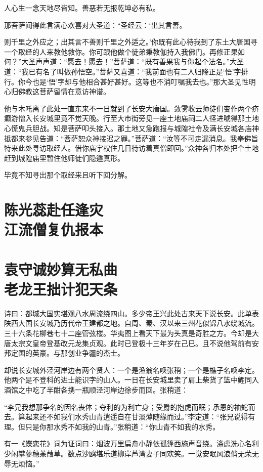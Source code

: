 \documentclass[12pt,UTF8]{ctexbook}
\begin{document}
{人心生一念天地尽皆知。善恶若无报乾坤必有私。

那菩萨闻得此言满心欢喜对大圣道：“圣经云：‘出其言善。

则千里之外应之；出其言不善则千里之外适之。’你既有此心待我到了东土大唐国寻一个取经的人来教他救你。你可跟他做个徒弟秉教伽持入我佛门。再修正果如何？”大圣声声道：“愿去！愿去！”菩萨道：“既有善果我与你起个法名。”大圣道：“我已有名了叫做孙悟空。”菩萨又喜道：“我前面也有二人归降正是‘悟’字排行。你今也是‘悟’字却与他相合甚好甚好。这等也不消叮嘱我去也。”那大圣见性明心归佛教这菩萨留情在意访神谱。

他与木吒离了此处一直东来不一日就到了长安大唐国。敛雾收云师徒们变作两个疥癫游憎入长安城里竟不觉天晚。行至大市街旁见一座土地庙祠二人径进唬得那土地心慌鬼兵胆战。知是菩萨叩头接入。那土地又急跑报与城隍社令及满长安城各庙神抵都来参见告道：“菩萨恕众神接迟之罪。”菩萨道：“汝等不可走漏消息。我奉佛旨特来此处寻访取经人。借你庙宇权住几日待访着真僧即回。”众神各归本处把个土地赶到城隍庙里暂住他师徒们隐遁真形。

毕竟不知寻出那个取经来且听下回分解。

\chapter[陈光蕊赴任逢灾\ 江流僧复仇报本]{陈光蕊赴任逢灾\\江流僧复仇报本}
\chapter[袁守诚妙算无私曲\ 老龙王拙计犯天条]{袁守诚妙算无私曲\\老龙王拙计犯天条}

诗曰：都城大国实堪观八水周流绕四山。多少帝王兴此处古来天下说长安。此单表陕西大国长安城乃历代帝王建都之地。自周、秦、汉以来三州花似锦八水绕城流。三十六条花柳巷七十二座管弦楼。华夷图上看天下最为头真是奇胜之方。今却是大唐太宗文皇帝登基改元龙集贞观。此时已登极十三年岁在己巳。且不说他驾前有安邦定国的英豪。与那创业争疆的杰士。

却说长安城外泾河岸边有两个贤人：一个是渔翁名唤张稍；一个是樵子名唤李定。他两个是不登科的进士能识字的山人。一日在长安城里卖了肩上柴货了篮中鲤同入酒馆之中吃了半酣各携一瓶顺泾河岸边徐步而回。张稍道：

“李兄我想那争名的因名丧体；夺利的为利亡身；受爵的抱虎而眠；承恩的袖蛇而去。算起来还不如我们水秀山青逍遥自在甘淡薄随缘而过。”李定道：“张兄说得有理。但只是你那水秀不如我的山青。”张稍道：“你山青不如我的水秀。

有一《蝶恋花》词为证词曰：烟波万里扁舟小静依孤篷西施声音绕。涤虑洗心名利少闲攀蓼穗蒹葭草。数点沙鸥堪乐道柳岸芦湾妻子同欢笑。一觉安眠风浪俏无荣无辱无烦恼。”

}
\end{document}
